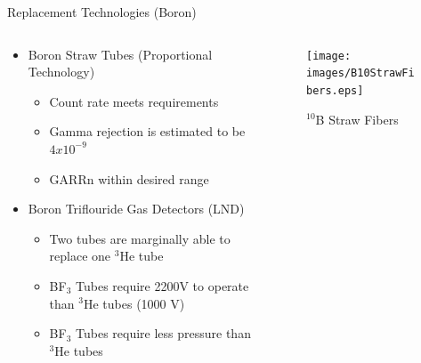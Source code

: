 \begin{frame}{Replacement Technologies (Boron)}
\begin{columns}[onlytextwidth]
\begin{column}{0.45\textwidth}
\begin{itemize}
	\small
	\item Boron Straw Tubes (Proportional Technology) \cite{kouzes_boron-lined_2012}
	\begin{itemize}
		\tiny
		\item Count rate meets requirements
		\item Gamma rejection is estimated to be $4x10^{-9}$
		\item GARRn within desired range
	\end{itemize}
	\small
	\item Boron Triflouride Gas Detectors (LND) \cite{kouzes_bf3_2009}
	\begin{itemize}
		\tiny
        \item Two tubes are marginally able to replace one ${}^3$He tube
		\item BF${}_3$ Tubes require 2200V to operate than ${}^3$He tubes (1000 V)
		\item BF${}_3$ Tubes require less pressure than ${}^3$He tubes
	\end{itemize}
\end{itemize}
\end{column}
\begin{column}{0.45\textwidth}
	\begin{figure}
	\centering
		\texttt{[image: images/B10StrawFibers.eps]}
		\caption{ ${}^{10}$B Straw Fibers}
		\label{fig:B10StrawFibers}

\end{figure}
\end{column}
\end{columns}
\end{frame}
